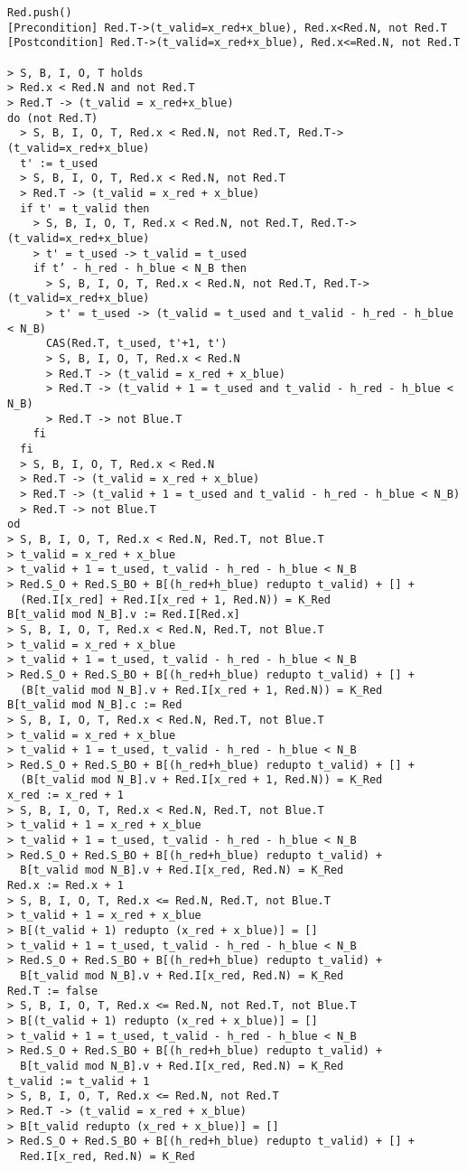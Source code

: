 \documentclass[a4paper, 11pt]{article}
\begin{document}
\begin{verbatim}
Red.push()
[Precondition] Red.T->(t_valid=x_red+x_blue), Red.x<Red.N, not Red.T
[Postcondition] Red.T->(t_valid=x_red+x_blue), Red.x<=Red.N, not Red.T

> S, B, I, O, T holds
> Red.x < Red.N and not Red.T
> Red.T -> (t_valid = x_red+x_blue)
do (not Red.T)
  > S, B, I, O, T, Red.x < Red.N, not Red.T, Red.T->(t_valid=x_red+x_blue)
  t' := t_used
  > S, B, I, O, T, Red.x < Red.N, not Red.T
  > Red.T -> (t_valid = x_red + x_blue)
  if t' = t_valid then
    > S, B, I, O, T, Red.x < Red.N, not Red.T, Red.T->(t_valid=x_red+x_blue)
    > t' = t_used -> t_valid = t_used
    if t’ - h_red - h_blue < N_B then
      > S, B, I, O, T, Red.x < Red.N, not Red.T, Red.T->(t_valid=x_red+x_blue)
      > t' = t_used -> (t_valid = t_used and t_valid - h_red - h_blue < N_B)
      CAS(Red.T, t_used, t'+1, t')
      > S, B, I, O, T, Red.x < Red.N
      > Red.T -> (t_valid = x_red + x_blue)
      > Red.T -> (t_valid + 1 = t_used and t_valid - h_red - h_blue < N_B)
      > Red.T -> not Blue.T
    fi
  fi
  > S, B, I, O, T, Red.x < Red.N
  > Red.T -> (t_valid = x_red + x_blue)
  > Red.T -> (t_valid + 1 = t_used and t_valid - h_red - h_blue < N_B)
  > Red.T -> not Blue.T
od
> S, B, I, O, T, Red.x < Red.N, Red.T, not Blue.T
> t_valid = x_red + x_blue
> t_valid + 1 = t_used, t_valid - h_red - h_blue < N_B
> Red.S_O + Red.S_BO + B[(h_red+h_blue) redupto t_valid) + [] +
  (Red.I[x_red] + Red.I[x_red + 1, Red.N)) = K_Red
B[t_valid mod N_B].v := Red.I[Red.x]
> S, B, I, O, T, Red.x < Red.N, Red.T, not Blue.T
> t_valid = x_red + x_blue
> t_valid + 1 = t_used, t_valid - h_red - h_blue < N_B
> Red.S_O + Red.S_BO + B[(h_red+h_blue) redupto t_valid) + [] +
  (B[t_valid mod N_B].v + Red.I[x_red + 1, Red.N)) = K_Red
B[t_valid mod N_B].c := Red
> S, B, I, O, T, Red.x < Red.N, Red.T, not Blue.T
> t_valid = x_red + x_blue
> t_valid + 1 = t_used, t_valid - h_red - h_blue < N_B
> Red.S_O + Red.S_BO + B[(h_red+h_blue) redupto t_valid) + [] +
  (B[t_valid mod N_B].v + Red.I[x_red + 1, Red.N)) = K_Red
x_red := x_red + 1
> S, B, I, O, T, Red.x < Red.N, Red.T, not Blue.T
> t_valid + 1 = x_red + x_blue
> t_valid + 1 = t_used, t_valid - h_red - h_blue < N_B
> Red.S_O + Red.S_BO + B[(h_red+h_blue) redupto t_valid) +
  B[t_valid mod N_B].v + Red.I[x_red, Red.N) = K_Red
Red.x := Red.x + 1
> S, B, I, O, T, Red.x <= Red.N, Red.T, not Blue.T
> t_valid + 1 = x_red + x_blue
> B[(t_valid + 1) redupto (x_red + x_blue)] = []
> t_valid + 1 = t_used, t_valid - h_red - h_blue < N_B
> Red.S_O + Red.S_BO + B[(h_red+h_blue) redupto t_valid) +
  B[t_valid mod N_B].v + Red.I[x_red, Red.N) = K_Red
Red.T := false
> S, B, I, O, T, Red.x <= Red.N, not Red.T, not Blue.T
> B[(t_valid + 1) redupto (x_red + x_blue)] = []
> t_valid + 1 = t_used, t_valid - h_red - h_blue < N_B
> Red.S_O + Red.S_BO + B[(h_red+h_blue) redupto t_valid) +
  B[t_valid mod N_B].v + Red.I[x_red, Red.N) = K_Red
t_valid := t_valid + 1
> S, B, I, O, T, Red.x <= Red.N, not Red.T
> Red.T -> (t_valid = x_red + x_blue)
> B[t_valid redupto (x_red + x_blue)] = []
> Red.S_O + Red.S_BO + B[(h_red+h_blue) redupto t_valid) + [] +
  Red.I[x_red, Red.N) = K_Red
\end{verbatim}
\end{document}
